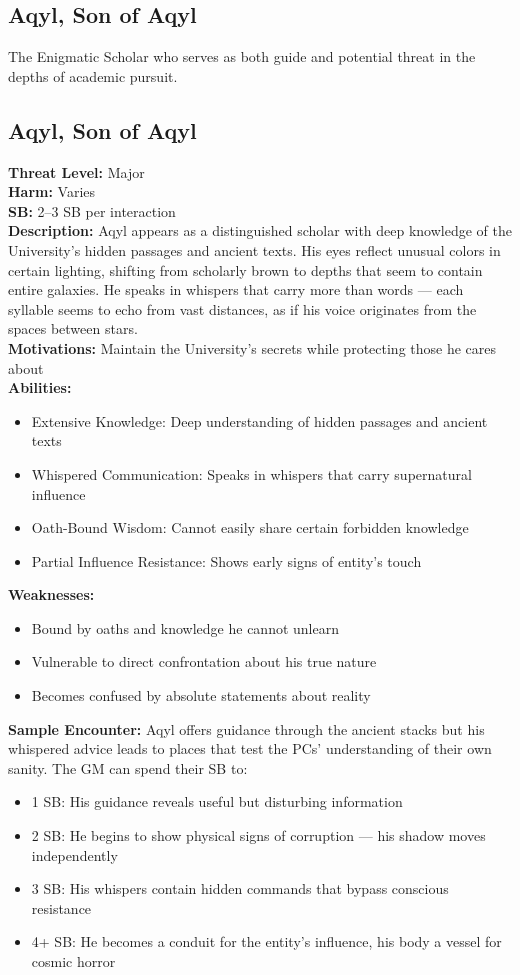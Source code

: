 \documentclass[11pt]{article}
\newenvironment{monsterentry}[1]{%
  \begin{mdframed}[backgroundcolor=shadecolor, linewidth=0pt, leftmargin=0pt, rightmargin=0pt]%
  \subsection*{#1}%
}{%
  \end{mdframed}%
}
\begin{document}
\subsection{Aqyl, Son of Aqyl}

The Enigmatic Scholar who serves as both guide and potential threat in the depths of academic pursuit.

\begin{monsterentry}{Aqyl, Son of Aqyl}
\textbf{Threat Level:} Major \\
\textbf{Harm:} Varies \\
\textbf{SB:} 2–3 SB per interaction \\
\textbf{Description:} Aqyl appears as a distinguished scholar with deep knowledge of the University's hidden passages and ancient texts. His eyes reflect unusual colors in certain lighting, shifting from scholarly brown to depths that seem to contain entire galaxies. He speaks in whispers that carry more than words — each syllable seems to echo from vast distances, as if his voice originates from the spaces between stars. \\
\textbf{Motivations:} Maintain the University's secrets while protecting those he cares about \\
\textbf{Abilities:}
\begin{itemize}
    \item Extensive Knowledge: Deep understanding of hidden passages and ancient texts
    \item Whispered Communication: Speaks in whispers that carry supernatural influence
    \item Oath-Bound Wisdom: Cannot easily share certain forbidden knowledge
    \item Partial Influence Resistance: Shows early signs of entity's touch
\end{itemize}
\textbf{Weaknesses:}
\begin{itemize}
    \item Bound by oaths and knowledge he cannot unlearn
    \item Vulnerable to direct confrontation about his true nature
    \item Becomes confused by absolute statements about reality
\end{itemize}
\textbf{Sample Encounter:} Aqyl offers guidance through the ancient stacks but his whispered advice leads to places that test the PCs' understanding of their own sanity. The GM can spend their SB to:
\begin{itemize}
    \item 1 SB: His guidance reveals useful but disturbing information
    \item 2 SB: He begins to show physical signs of corruption — his shadow moves independently
    \item 3 SB: His whispers contain hidden commands that bypass conscious resistance
    \item 4+ SB: He becomes a conduit for the entity's influence, his body a vessel for cosmic horror
\end{itemize}
\end{monsterentry}
\end{document}
